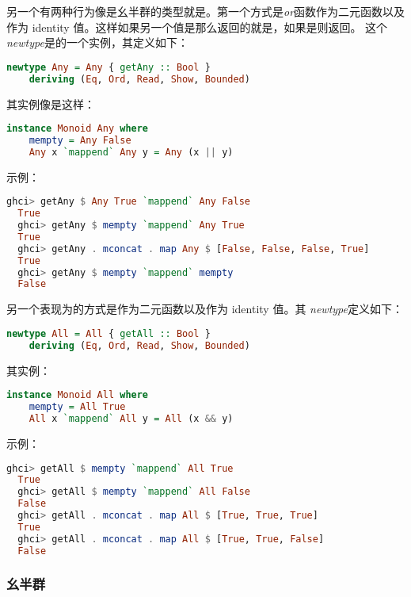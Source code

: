 \documentclass[./main.tex]{subfiles}
\begin{document}
另一个有两种行为像是幺半群的类型就是。第一个方式是\textit{or}函数\acode{||}作为二元函数以及
作为 identity 值。这样如果另一个值是那么返回的就是，如果是则返回。
这个\textit{newtype}是的一个实例，其定义如下：

\begin{lstlisting}[language=Haskell]
  newtype Any = Any { getAny :: Bool }
    deriving (Eq, Ord, Read, Show, Bounded)
\end{lstlisting}

其实例像是这样：

\begin{lstlisting}[language=Haskell]
  instance Monoid Any where
    mempty = Any False
    Any x `mappend` Any y = Any (x || y)
\end{lstlisting}

示例：

\begin{lstlisting}[language=Haskell]
  ghci> getAny $ Any True `mappend` Any False
  True
  ghci> getAny $ mempty `mappend` Any True
  True
  ghci> getAny . mconcat . map Any $ [False, False, False, True]
  True
  ghci> getAny $ mempty `mappend` mempty
  False
\end{lstlisting}

另一个表现为的方式是\acode{&&}作为二元函数以及作为 identity 值。其
\textit{newtype}定义如下：

\begin{lstlisting}[language=Haskell]
  newtype All = All { getAll :: Bool }
    deriving (Eq, Ord, Read, Show, Bounded)
\end{lstlisting}

其实例：

\begin{lstlisting}[language=Haskell]
  instance Monoid All where
    mempty = All True
    All x `mappend` All y = All (x && y)
\end{lstlisting}

示例：

\begin{lstlisting}[language=Haskell]
  ghci> getAll $ mempty `mappend` All True
  True
  ghci> getAll $ mempty `mappend` All False
  False
  ghci> getAll . mconcat . map All $ [True, True, True]
  True
  ghci> getAll . mconcat . map All $ [True, True, False]
  False
\end{lstlisting}

\subsubsection*{幺半群}
\end{document}
